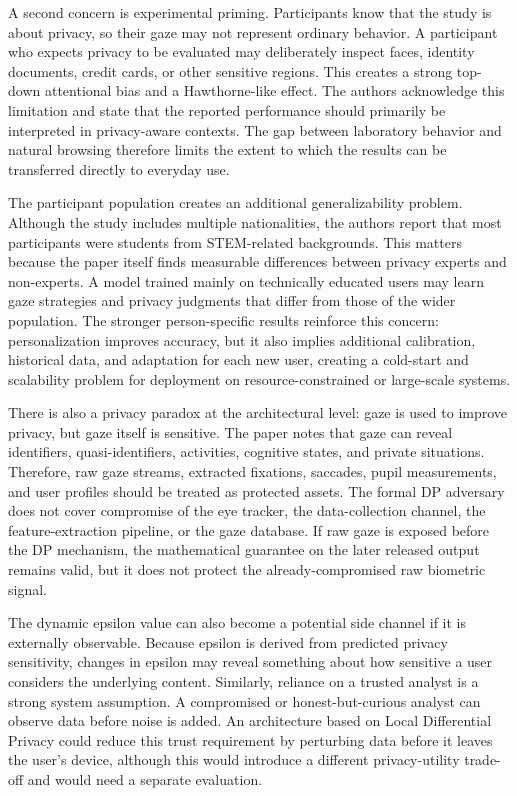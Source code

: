 \documentclass[11pt,a4paper]{article}
\begin{document}
A second concern is experimental priming. Participants know that the study is about privacy, so their gaze may not represent ordinary behavior. A participant who expects privacy to be evaluated may deliberately inspect faces, identity documents, credit cards, or other sensitive regions. This creates a strong top-down attentional bias and a Hawthorne-like effect. The authors acknowledge this limitation and state that the reported performance should primarily be interpreted in privacy-aware contexts. The gap between laboratory behavior and natural browsing therefore limits the extent to which the results can be transferred directly to everyday use.


The participant population creates an additional generalizability problem. Although the study includes multiple nationalities, the authors report that most participants were students from STEM-related backgrounds. This matters because the paper itself finds measurable differences between privacy experts and non-experts. A model trained mainly on technically educated users may learn gaze strategies and privacy judgments that differ from those of the wider population. The stronger person-specific results reinforce this concern: personalization improves accuracy, but it also implies additional calibration, historical data, and adaptation for each new user, creating a cold-start and scalability problem for deployment on resource-constrained or large-scale systems.


There is also a privacy paradox at the architectural level: gaze is used to improve privacy, but gaze itself is sensitive. The paper notes that gaze can reveal identifiers, quasi-identifiers, activities, cognitive states, and private situations. Therefore, raw gaze streams, extracted fixations, saccades, pupil measurements, and user profiles should be treated as protected assets. The formal DP adversary does not cover compromise of the eye tracker, the data-collection channel, the feature-extraction pipeline, or the gaze database. If raw gaze is exposed before the DP mechanism, the mathematical guarantee on the later released output remains valid, but it does not protect the already-compromised raw biometric signal.


The dynamic epsilon value can also become a potential side channel if it is externally observable. Because epsilon is derived from predicted privacy sensitivity, changes in epsilon may reveal something about how sensitive a user considers the underlying content. Similarly, reliance on a trusted analyst is a strong system assumption. A compromised or honest-but-curious analyst can observe data before noise is added. An architecture based on Local Differential Privacy could reduce this trust requirement by perturbing data before it leaves the user's device, although this would introduce a different privacy-utility trade-off and would need a separate evaluation.
\end{document}
